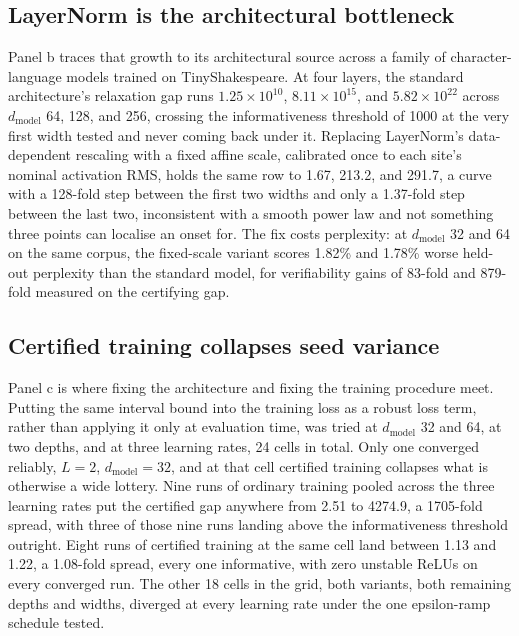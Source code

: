 \documentclass[sn-nature,pdflatex]{sn-jnl}
\begin{document}
\subsection{LayerNorm is the architectural bottleneck}

Panel b traces that growth to its architectural source across a family of character-language models trained on TinyShakespeare. At four layers, the standard architecture's relaxation gap runs $1.25\times10^{10}$, $8.11\times10^{15}$, and $5.82\times10^{22}$ across $d_{\text{model}}$ 64, 128, and 256, crossing the informativeness threshold of 1000 at the very first width tested and never coming back under it. Replacing LayerNorm's data-dependent rescaling with a fixed affine scale, calibrated once to each site's nominal activation RMS, holds the same row to 1.67, 213.2, and 291.7, a curve with a 128-fold step between the first two widths and only a 1.37-fold step between the last two, inconsistent with a smooth power law and not something three points can localise an onset for. The fix costs perplexity: at $d_{\text{model}}$ 32 and 64 on the same corpus, the fixed-scale variant scores 1.82\% and 1.78\% worse held-out perplexity than the standard model, for verifiability gains of 83-fold and 879-fold measured on the certifying gap.

\subsection{Certified training collapses seed variance}

Panel c is where fixing the architecture and fixing the training procedure meet. Putting the same interval bound into the training loss as a robust loss term, rather than applying it only at evaluation time, was tried at $d_{\text{model}}$ 32 and 64, at two depths, and at three learning rates, 24 cells in total. Only one converged reliably, $L=2$, $d_{\text{model}}=32$, and at that cell certified training collapses what is otherwise a wide lottery. Nine runs of ordinary training pooled across the three learning rates put the certified gap anywhere from 2.51 to 4274.9, a 1705-fold spread, with three of those nine runs landing above the informativeness threshold outright. Eight runs of certified training at the same cell land between 1.13 and 1.22, a 1.08-fold spread, every one informative, with zero unstable ReLUs on every converged run. The other 18 cells in the grid, both variants, both remaining depths and widths, diverged at every learning rate under the one epsilon-ramp schedule tested.
\end{document}
